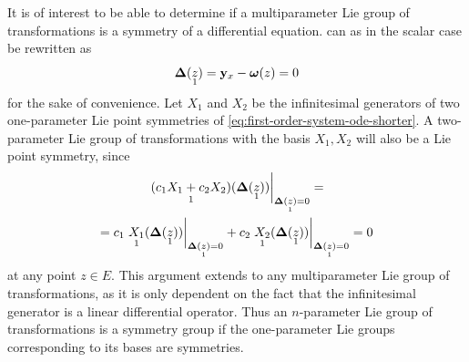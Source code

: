 It is of interest to be able to determine if a multiparameter Lie group of transformations is a symmetry of a differential equation.
 can as in the scalar case be rewritten as
\begin{equation} \label{eq:first-order-system-ode-shorter}
  \vb*{\Delta}(\prolong{z}{1}) = \vb{y}_x - \vb*{\omega}(z) = 0
\end{equation}
for the sake of convenience.
Let \(X_1\) and \(X_2\) be the infinitesimal generators of two one-parameter Lie point symmetries of \cref{eq:first-order-system-ode-shorter}.
A two-parameter Lie group of transformations with the basis \(X_1, X_2\) will also be a Lie point symmetry, since
\begin{multline}
  \eval{\prolong{(c_1 X_1 + c_2 X_2)}{1}(\vb*{\Delta}(\prolong{z}{1}))}_{\vb*{\Delta}(\prolong{z}{1}) = 0} =\\
  = c_1 \eval{\prolong{X_1}{1}(\vb*{\Delta}(\prolong{z}{1}))}_{\vb*{\Delta}(\prolong{z}{1}) = 0} + c_2 \eval{\prolong{X_2}{1}(\vb*{\Delta}(\prolong{z}{1}))}_{\vb*{\Delta}(\prolong{z}{1}) = 0} =
  0
\end{multline}
at any point \(z \in E\).
This argument extends to any multiparameter Lie group of transformations, as it is only dependent on the fact that the infinitesimal generator is a linear differential operator.
Thus an \(n\)-parameter Lie group of transformations is a symmetry group if the one-parameter Lie groups corresponding to its bases are symmetries.

